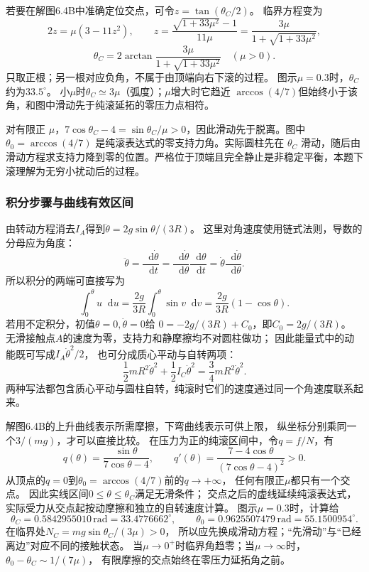\documentclass[UTF8,fontset=fandol,a4paper,11pt]{ctexart}
\newcommand{\dd}{\mathop{}\!\mathrm{d}}
\begin{document}
若要在解图6.4B中准确定位交点，可令$z=\tan(\theta_C/2)$。
临界方程变为
\[
2z=\mu(3-11z^2),\qquad
z=\frac{\sqrt{1+33\mu^2}-1}{11\mu}
=\frac{3\mu}{1+\sqrt{1+33\mu^2}},
\]
\[
\theta_C=2\arctan\frac{3\mu}{1+\sqrt{1+33\mu^2}}\quad(\mu>0).
\]
只取正根；另一根对应负角，不属于由顶端向右下滚的过程。
图示$\mu=0.3$时，$\theta_C$约为$33.5^\circ$。
小$\mu$时$\theta_C\simeq3\mu$（弧度）；$\mu$增大时它趋近
$\arccos(4/7)$但始终小于该角，和图中滑动先于纯滚延拓的零压力点相符。

对有限正 $\mu$，$7\cos\theta_C-4=\sin\theta_C/\mu>0$，因此滑动先于脱离。图中 $\theta_0=\arccos(4/7)$ 是纯滚表达式的零支持力角。实际圆柱先在 $\theta_C$ 滑动，随后由滑动方程求支持力降到零的位置。严格位于顶端且完全静止是非稳定平衡，本题下滚理解为无穷小扰动后的过程。
\subsubsection*{积分步骤与曲线有效区间}
由转动方程消去$I_A$得到$\ddot\theta=2g\sin\theta/(3R)$。
这里对角速度使用链式法则，导数的分母应为角度：
\[
\ddot\theta=\frac{\dd\dot\theta}{\dd t}
=\frac{\dd\dot\theta}{\dd\theta}\frac{\dd\theta}{\dd t}
=\dot\theta\frac{\dd\dot\theta}{\dd\theta}.
\]
所以积分的两端可直接写为
\[
\int_0^{\dot\theta}u\dd u
=\frac{2g}{3R}\int_0^\theta\sin v\dd v
=\frac{2g}{3R}(1-\cos\theta).
\]
若用不定积分，初值$\theta=0,\dot\theta=0$给
$0=-2g/(3R)+C_0$，即$C_0=2g/(3R)$。
无滑接触点$A$的速度为零，支持力和静摩擦均不对圆柱做功；
因此能量式中的动能既可写成$I_A\dot\theta^2/2$，
也可分成质心平动与自转两项：
\[
\frac12mR^2\dot\theta^2+\frac12I_C\dot\theta^2
=\frac34mR^2\dot\theta^2.
\]
两种写法都包含质心平动与圆柱自转，纯滚时它们的速度通过同一个角速度联系起来。

解图6.4B的上升曲线表示所需摩擦，下弯曲线表示可供上限，
纵坐标分别乘同一个$3/(mg)$，才可以直接比较。
在压力为正的纯滚区间中，令$q= f/N$，有
\[
q(\theta)=\frac{\sin\theta}{7\cos\theta-4},
\qquad
q'(\theta)=\frac{7-4\cos\theta}{(7\cos\theta-4)^2}>0.
\]
从顶点的$q=0$到$\theta_0=\arccos(4/7)$前的$q\to+\infty$，
任何有限正$\mu$都只有一个交点。
因此实线区间$0\leq\theta\leq\theta_C$满足无滑条件；
交点之后的虚线延续纯滚表达式，实际受力从交点起按动摩擦和独立的自转速度计算。
图示$\mu=0.3$时，计算给
\[
\theta_C=0.5842955010\,\mathrm{rad}=33.4776662^\circ,
\qquad
\theta_0=0.9625507479\,\mathrm{rad}=55.1500954^\circ.
\]
在临界处$N_C=mg\sin\theta_C/(3\mu)>0$，
所以应先换成滑动方程；“先滑动”与“已经离边”对应不同的接触状态。
当$\mu\to0^+$时临界角趋零；当$\mu\to\infty$时，
$\theta_0-\theta_C\sim1/(7\mu)$，
有限摩擦的交点始终在零压力延拓角之前。
\end{document}
